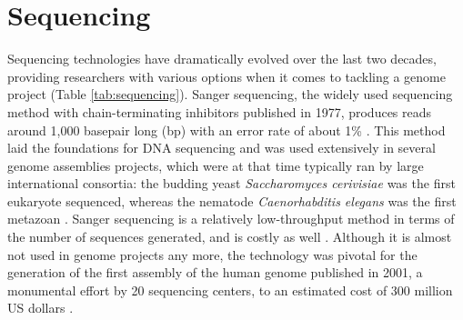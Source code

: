 \section{Sequencing}

Sequencing technologies have dramatically evolved over the last two decades, providing researchers with various options when it comes to tackling a genome project (Table \ref{tab:sequencing}). Sanger sequencing, the widely used sequencing method with chain-terminating inhibitors published in 1977, produces reads around 1,000 basepair long (bp) with an error rate of about 1\% \cite{Sanger1977}. This method laid the foundations for DNA sequencing and was used extensively in several genome assemblies projects, which were at that time typically ran by large international consortia: the budding yeast \textit{Saccharomyces cerivisiae} \cite{saccharomyces_cerevisiae} was the first eukaryote sequenced, whereas the nematode \textit{Caenorhabditis elegans} was the first metazoan \cite{caenorhabditis_elegans2}. Sanger sequencing is a relatively low-throughput method in terms of the number of sequences generated, and is costly as well \cite{Wajid2016}. Although it is almost not used in genome projects any more, the technology was pivotal for the generation of the first assembly of the human genome published in 2001, a monumental effort by 20 sequencing centers, to an estimated cost of 300 million US dollars \cite{firsthumangenome}. \\

